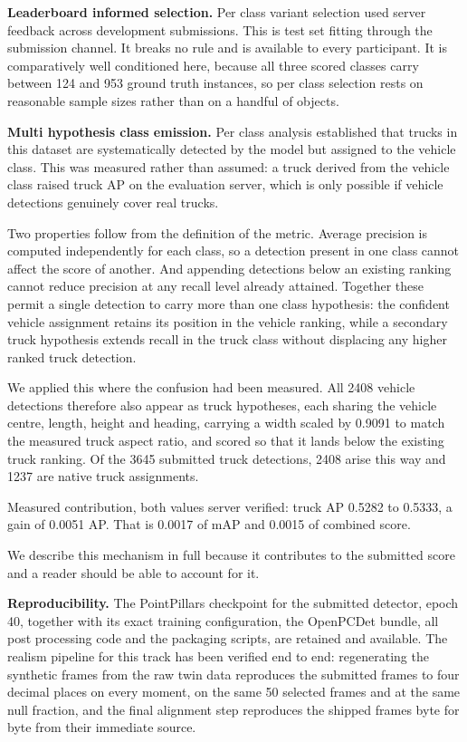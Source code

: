 \documentclass[
  10pt,
]{article}
\begin{document}
\textbf{Leaderboard informed selection.} Per class variant selection
used server feedback across development submissions. This is test set
fitting through the submission channel. It breaks no rule and is
available to every participant. It is comparatively well conditioned
here, because all three scored classes carry between 124 and 953 ground
truth instances, so per class selection rests on reasonable sample sizes
rather than on a handful of objects.

\textbf{Multi hypothesis class emission.} Per class analysis established
that trucks in this dataset are systematically detected by the model but
assigned to the vehicle class. This was measured rather than assumed: a
truck derived from the vehicle class raised truck AP on the evaluation
server, which is only possible if vehicle detections genuinely cover
real trucks.

Two properties follow from the definition of the metric. Average
precision is computed independently for each class, so a detection
present in one class cannot affect the score of another. And appending
detections below an existing ranking cannot reduce precision at any
recall level already attained. Together these permit a single detection
to carry more than one class hypothesis: the confident vehicle
assignment retains its position in the vehicle ranking, while a
secondary truck hypothesis extends recall in the truck class without
displacing any higher ranked truck detection.

We applied this where the confusion had been measured. All 2408 vehicle
detections therefore also appear as truck hypotheses, each sharing the
vehicle centre, length, height and heading, carrying a width scaled by
0.9091 to match the measured truck aspect ratio, and scored so that it
lands below the existing truck ranking. Of the 3645 submitted truck
detections, 2408 arise this way and 1237 are native truck assignments.

Measured contribution, both values server verified: truck AP 0.5282 to
0.5333, a gain of 0.0051 AP. That is 0.0017 of mAP and 0.0015 of
combined score.

We describe this mechanism in full because it contributes to the
submitted score and a reader should be able to account for it.

\textbf{Reproducibility.} The PointPillars checkpoint for the submitted
detector, epoch 40, together with its exact training configuration, the
OpenPCDet bundle, all post processing code and the packaging scripts,
are retained and available. The realism pipeline for this track has been
verified end to end: regenerating the synthetic frames from the raw twin
data reproduces the submitted frames to four decimal places on every
moment, on the same 50 selected frames and at the same null fraction,
and the final alignment step reproduces the shipped frames byte for byte
from their immediate source.
\end{document}
